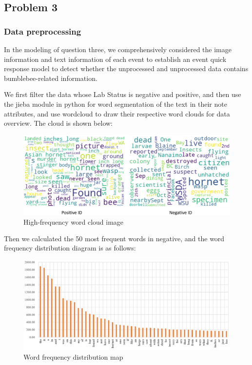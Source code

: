 \documentclass{mcmthesis}
\begin{document}
\hspace*{\fill}
\subsection{Problem 3}
\subsubsection{Data preprocessing}
In the modeling of question three, we comprehensively considered the image information and text information of each event to establish an event quick response model to detect whether the unprocessed and unprocessed data contains bumblebee-related information.

We first filter the data whose Lab Status is negative and positive, and then use the jieba module in python for word segmentation of the text in their note attributes, and use wordcloud to draw their respective word clouds for data overview. 
The cloud is shown below:
\begin{figure}[H]
	\centering
	\includegraphics[width=\textwidth]{screenshot015}
	\caption{High-frequency word cloud image}
	\label{fig:screenshot015}
\end{figure}

Then we calculated the 50 most frequent words in negative, and the word frequency distribution diagram is as follows:

\begin{figure}[H]
	\centering
	\includegraphics[width=\textwidth]{screenshot016}
	\caption{Word frequency distribution map}
	\label{fig:screenshot016}
\end{figure}
\end{document}
